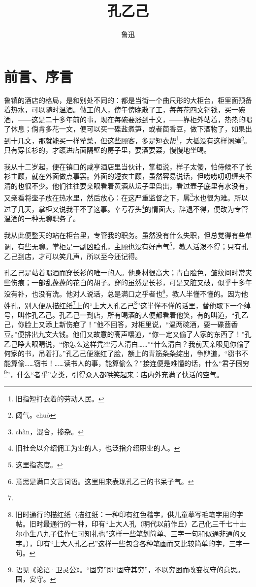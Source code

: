\documentclass[12pt,UTF8]{ctexbook}
\title{\heiti\zihao{0} 孔乙己}
\author{鲁迅}
\date{}
\begin{document}
\maketitle
\tableofcontents

\frontmatter
\chapter{前言、序言}

\mainmatter

鲁镇的酒店的格局，是和别处不同的：都是当街一个曲尺形的大柜台，柜里面预备着热水，可以随时温酒。做工的人，傍午傍晚散了工，每每花四文铜钱，买一碗酒，——这是二十多年前的事，现在每碗要涨到十文，——靠柜外站着，热热的喝了休息；倘肯多花一文，便可以买一碟盐煮笋，或者茴香豆，做下酒物了，如果出到十几文，那就能买一样荤菜，但这些顾客，多是短衣帮\footnote{旧指短打衣着的劳动人民。}，大抵没有这样阔绰\footnote{阔气。chuò}。只有穿长衫的，才踱进店面隔壁的房子里，要酒要菜，慢慢地坐喝。

我从十二岁起，便在镇口的咸亨酒店里当伙计，掌柜说，样子太傻，怕侍候不了长衫主顾，就在外面做点事罢。外面的短衣主顾，虽然容易说话，但唠唠叨叨缠夹不清的也很不少。他们往往要亲眼看着黄酒从坛子里舀出，看过壶子底里有水没有，又亲看将壶子放在热水里，然后放心：在这严重监督之下，羼\footnote{chàn，混合，掺杂。}水也很为难。所以过了几天，掌柜又说我干不了这事。幸亏荐头\footnote{旧社会以介绍佣工为业的人，也泛指介绍职业的人。}的情面大，辞退不得，便改为专管温酒的一种无聊职务了。

我从此便整天的站在柜台里，专管我的职务。虽然没有什么失职，但总觉得有些单调，有些无聊。掌柜是一副凶脸孔，主顾也没有好声气\footnote{这里指态度。}，教人活泼不得；只有孔乙己到店，才可以笑几声，所以至今还记得。

孔乙己是站着喝酒而穿长衫的唯一的人。他身材很高大；青白脸色，皱纹间时常夹些伤痕；一部乱蓬蓬的花白的胡子。穿的虽然是长衫，可是又脏又破，似乎十多年没有补，也没有洗。他对人说话，总是满口之乎者也\footnote{意思是满口文言词语。这里用来表现孔乙己的书呆子气。}，教人半懂不懂的。因为他姓孔，别人便从描红纸\footnote{}上的“上大人孔乙己\footnote{旧时通行的描红纸（描红纸：一种印有红色楷字，供儿童摹写毛笔字用的字帖。旧时最通行的一种，印有“上大人孔（明代以前作丘）乙己化三千七十士尔小生八九子佳作仁可知礼也”这样一些笔划简单、三字一句和似通非通的文字。），印有“上大人孔乙己”这样一些包含各种笔画而又比较简单的字，三字一句。}”这半懂不懂的话里，替他取下一个绰号，叫作孔乙己。孔乙己一到店，所有喝酒的人便都看着他笑，有的叫道，“孔乙己，你脸上又添上新伤疤了！”他不回答，对柜里说，“温两碗酒，要一碟茴香豆。”便排出九文大钱。他们又故意的高声嚷道，“你一定又偷了人家的东西了！”孔乙己睁大眼睛说，“你怎么这样凭空污人清白……”“什么清白？我前天亲眼见你偷了何家的书，吊着打。”孔乙己便涨红了脸，额上的青筋条条绽出，争辩道，“窃书不能算偷……窃书！……读书人的事，能算偷么？”接连便是难懂的话，什么“君子固穷\footnote{语见《论语·卫灵公》。“固穷”即“固守其穷”，不以穷困而改变操守的意思。固，安守。}”，什么“者乎”之类，引得众人都哄笑起来：店内外充满了快活的空气。
\end{document}
